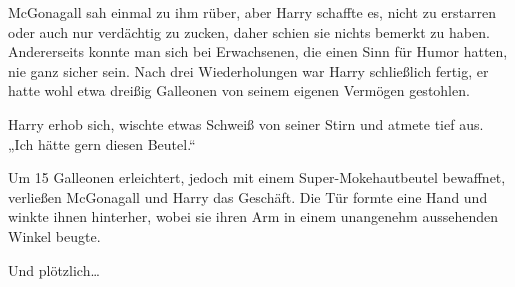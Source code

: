McGonagall sah einmal zu ihm rüber, aber Harry schaffte es, nicht zu erstarren oder auch nur verdächtig zu zucken, daher schien sie nichts bemerkt zu haben. Andererseits konnte man sich bei Erwachsenen, die einen Sinn für Humor hatten, nie ganz sicher sein.
Nach drei Wiederholungen war Harry schließlich fertig, er hatte wohl etwa dreißig Galleonen von seinem eigenen Vermögen gestohlen.

Harry erhob sich, wischte etwas Schweiß von seiner Stirn und atmete tief aus. „Ich hätte gern diesen Beutel.“

Um 15 Galleonen erleichtert, jedoch mit einem Super-Mokehautbeutel  bewaffnet, verließen McGonagall und Harry das Geschäft. Die Tür formte eine Hand und winkte ihnen hinterher, wobei sie ihren Arm in einem unangenehm aussehenden Winkel beugte.

Und plötzlich…

